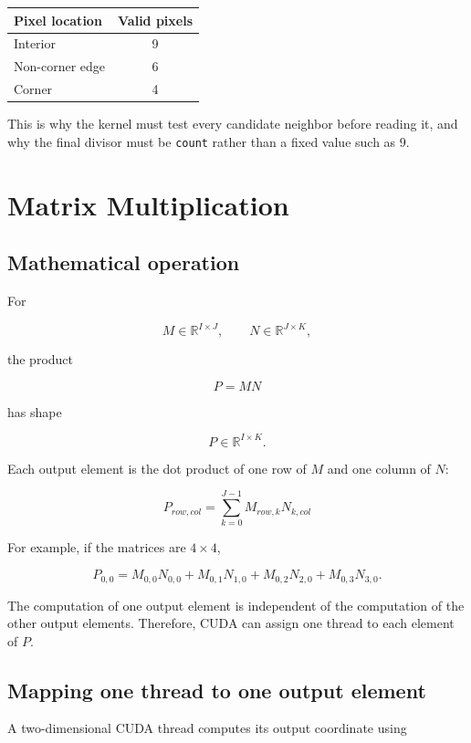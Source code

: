 \documentclass[11pt,a4paper]{article}
\begin{document}
\begin{center}
\begin{tabular}{lc}
\toprule
Pixel location & Valid pixels \\
\midrule
Interior & 9 \\
Non-corner edge & 6 \\
Corner & 4 \\
\bottomrule
\end{tabular}
\end{center}

This is why the kernel must test every candidate neighbor before reading it, and why the final divisor must be \texttt{count} rather than a fixed value such as \(9\).

\section{Matrix Multiplication}

\subsection{Mathematical operation}

For

\[
M\in\mathbb{R}^{I\times J},
\qquad
N\in\mathbb{R}^{J\times K},
\]

the product

\[
P=MN
\]

has shape

\[
P\in\mathbb{R}^{I\times K}.
\]

Each output element is the dot product of one row of \(M\) and one column of \(N\):

\[
\boxed{
P_{row,col}
=
\sum_{k=0}^{J-1}
M_{row,k}N_{k,col}
}
\]

For example, if the matrices are \(4\times4\),

\[
P_{0,0}
=
M_{0,0}N_{0,0}
+
M_{0,1}N_{1,0}
+
M_{0,2}N_{2,0}
+
M_{0,3}N_{3,0}.
\]

The computation of one output element is independent of the computation of the other output elements. Therefore, CUDA can assign one thread to each element of \(P\).

\subsection{Mapping one thread to one output element}

A two-dimensional CUDA thread computes its output coordinate using
\end{document}
